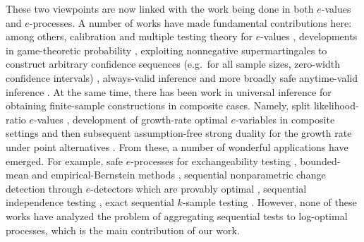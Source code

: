 \documentclass{article}
\theoremstyle{definition}
\begin{document}
These two viewpoints are now linked with the work being done in both $e$-values and $e$-processes. A number of works have made fundamental contributions here: among others, calibration and multiple testing theory for $e$-values \citep{VovkWang2021}, developments in game-theoretic probability \citep{Shafer2021, RamdasGrunwaldVovkShafer2023}, exploiting nonnegative supermartingales to construct arbitrary confidence sequences (e.g.\ for all sample sizes, zero-width confidence intervals) \citep{HowardEtAl2021}, always-valid inference and more broadly safe anytime-valid inference \citep{johari2022, RamdasGrunwaldVovkShafer2023}. At the same time, there has been work in universal inference for obtaining finite-sample constructions in composite cases. Namely, split likelihood-ratio $e$-values \citep{wasserman2020universal}, development of growth-rate optimal $e$-variables in composite settings and then subsequent assumption-free strong duality for the growth rate under point alternatives \citep{GrunwaldDeHeideKoolen2024, LarssonRamdasRuf2025}. From these, a number of wonderful applications have emerged. For example, safe $e$-processes for exchangeability testing \citep{ramdas2022testing}, bounded-mean and empirical-Bernstein methods \citep{WaudbySmithRamdas2024}, sequential nonparametric change detection through $e$-detectors \citep{shin2024edetectors} which are provably optimal \citep{ram2026asymptoticallyoptimalsequentialchange}, sequential independence testing \citep{podkopaev2023}, exact sequential $k$-sample testing \citep{turner2024}. However, none of these works have analyzed the problem of aggregating sequential tests to log-optimal processes, which is the main contribution of our work.
\end{document}

